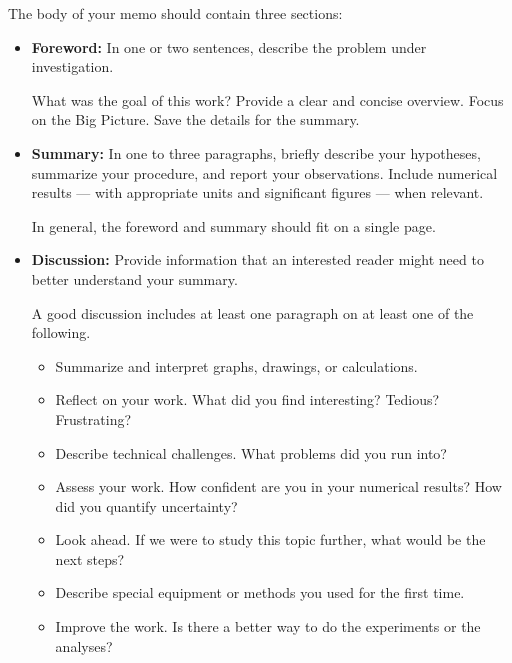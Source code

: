 The body of your memo should contain three sections:
\begin{itemize}[itemsep=5pt]
\item\textbf{Foreword:}
In one or two sentences, describe the problem under investigation.

What was the goal of this work?  Provide a clear and concise overview.  Focus on the Big Picture.  Save the details for the summary.

\item\textbf{Summary:}
In one to three paragraphs, briefly describe your hypotheses, summarize your procedure, and report your observations.  Include numerical results --- with appropriate units and significant figures --- when relevant.

In general, the foreword and summary should fit on a single page.

\item\textbf{Discussion:}
Provide information that an interested reader might need to better understand your summary.

A good discussion includes at least one paragraph on at least one of the following.
\begin{itemize}[noitemsep]
	\item Summarize and interpret graphs, drawings, or calculations.
	\item Reflect on your work.  What did you find interesting?  Tedious?  Frustrating?
	\item Describe technical challenges.  What problems did you run into?
	\item Assess your work.  How confident are you in your numerical results?  How did you quantify uncertainty?
	\item Look ahead.  If we were to study this topic further, what would be the next steps?
	\item Describe special equipment or methods you used for the first time.
	\item Improve the work.  Is there a better way to do the experiments or the analyses?
\end{itemize}
\end{itemize}
